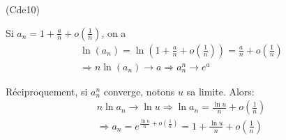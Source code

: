 \begin{tiny}(Cde10)\end{tiny} 
Si $a_n = 1+\frac{a}{n}+o(\frac{1}{n})$, on a 
\begin{multline*}
 \ln(a_n)=\ln(1+\frac{a}{n}+o(\frac{1}{n}))=\frac{a}{n}+o(\frac{1}{n})\\
\Rightarrow n\ln(a_n)\rightarrow a \Rightarrow a_n^n \rightarrow e^a
\end{multline*}

Réciproquement, si $a_n^n$ converge, notons $u$ sa limite. Alors:
\begin{multline*}
 n\ln a_n \rightarrow \ln u \Rightarrow \ln a_n = \frac{\ln u}{n} +o(\frac{1}{n}) \\
\Rightarrow a_n = e^{\frac{\ln u}{n} +o(\frac{1}{n})} = 1 + \frac{\ln u}{n} +o(\frac{1}{n})
\end{multline*}


